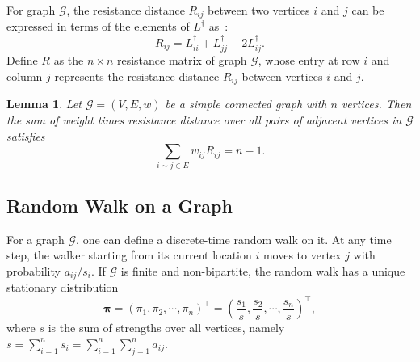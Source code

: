 \documentclass[sigconf]{acmart}
\newtheorem{lemma}[theorem]{Lemma}
\def\calG{\mathcal{G}}
\newcommand\ppi{\boldsymbol{\pi}}
\newcommand\LL{\boldsymbol{\mathit{L}}}
\newcommand\RR{\boldsymbol{\mathit{R}}}
\begin{document}

For  graph $\calG$, the resistance distance  $R_{ij}$ between two vertices $i$ and $j$ can be expressed in terms of the elements of $\LL^{\dagger}$ as~\cite{KlRa93}:
\begin{equation}\label{EE04}
	R_{ij}={\LL}_{ii}^{\dagger}+{\LL}_{jj}^{\dagger}-2{\LL}_{ij}^{\dagger}.
\end{equation}
Define $\RR$ as  the $n \times n$ resistance matrix of graph $\calG$, whose entry at row $i$ and column $j$ represents the resistance distance  $R_{ij}$ between  vertices $i$ and $j$.

\begin{lemma}\label{Foster} \cite{Te91}
	Let $\calG=(V,E,w)$ be a simple connected graph with $n$ vertices. Then the sum of  weight times resistance distance over all pairs of adjacent vertices in  $\calG$  satisfies
	\begin{equation*}
		\sum_{ i\sim j\in E }w_{ij}R_{ij}=n-1.
	\end{equation*}
\end{lemma}



\subsection{Random Walk on a Graph}

For a graph  $\calG$, one can define a  discrete-time random walk  on it. At any time step, the walker starting from its current location $i$ moves to  vertex $j$ with  probability  $a_{ij}/s_i$. If  $\calG$ is  finite and non-bipartite, the random walk  has a unique stationary distribution~\cite{LiZh13PRE}
\begin{equation}\label{EE01}
	\ppi=(\pi_1, \pi_2, \cdots, \pi_n)^{\top}=\left(\frac{s_1}{s}, \frac{s_2}{s}, \cdots, \frac{s_n}{s}\right)^{\top},
\end{equation}
where $s$ is the sum of strengths over all vertices, namely $s=\sum_{i=1}^n s_i=\sum_{i=1}^{n}\sum_{j=1}^{n} a_{ij}$.
\end{document}
